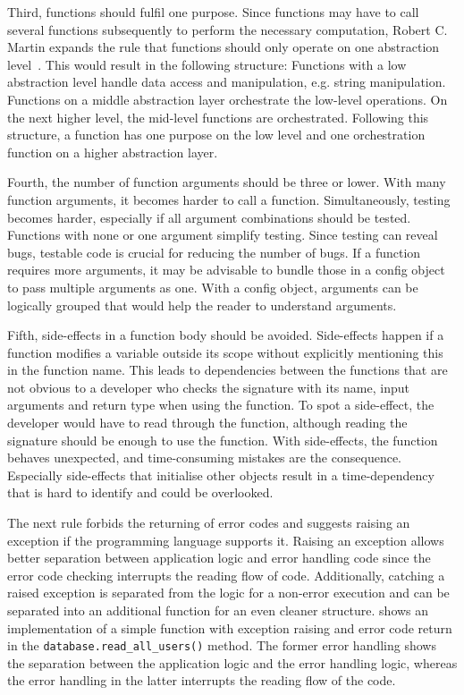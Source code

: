 Third, functions should fulfil one purpose. Since functions may have to call several functions subsequently to perform the necessary computation, Robert C. Martin expands the rule that functions should only operate on one abstraction level~\cite{martin_clean_2009}. This would result in the following structure:
Functions with a low abstraction level handle data access and manipulation, e.g. string manipulation. Functions on a middle abstraction layer orchestrate the low-level operations. On the next higher level, the mid-level functions are orchestrated. Following this structure, a function has one purpose on the low level and one orchestration function on a higher abstraction layer. 

Fourth, the number of function arguments should be three or lower. With many function arguments, it becomes harder to call a function. Simultaneously, testing becomes harder, especially if all argument combinations should be tested. Functions with none or one argument simplify testing. Since testing can reveal bugs, testable code is crucial for reducing the number of bugs.
If a function requires more arguments, it may be advisable to bundle those in a config object to pass multiple arguments as one. With a config object, arguments can be logically grouped that would help the reader to understand arguments. 

Fifth, side-effects in a function body should be avoided. Side-effects happen if a function modifies a variable outside its scope without explicitly mentioning this in the function name. This leads to dependencies between the functions that are not obvious to a developer who checks the signature with its name, input arguments and return type when using the function. To spot a side-effect, the developer would have to read through the function, although reading the signature should be enough to use the function. With side-effects, the function behaves unexpected, and time-consuming mistakes are the consequence. Especially side-effects that initialise other objects result in a time-dependency that is hard to identify and could be overlooked.

The next rule forbids the returning of error codes and suggests raising an exception if the programming language supports it. Raising an exception allows better separation between application logic and error handling code since the error code checking interrupts the reading flow of code. Additionally, catching a raised exception is separated from the logic for a non-error execution and can be separated into an additional function for an even cleaner structure.  shows an implementation of a simple function with exception raising and error code return in the \texttt{database.read\_all\_users()} method. The former error handling shows the separation between the application logic and the error handling logic, whereas the error handling in the latter interrupts the reading flow of the code.

